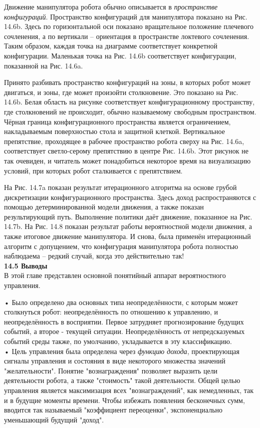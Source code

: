 \documentclass[10pt,a4paper]{article}
\begin{document}
Движение манипулятора робота обычно описывается в \textit{пространстве конфигураций}. Пространство конфигураций для манипулятора показано на Рис. 14.6b. Здесь по горизонтальной оси показано вращательное положение плечевого сочленения, а по вертикали – ориентация в пространстве локтевого сочленения. Таким образом, каждая точка на диаграмме соответствует конкретной конфигурации. Маленькая точка на Рис. 14.6b соответствует конфигурации, показанной на Рис. 14.6a.

Принято разбивать пространство конфигураций на зоны, в которых робот может двигаться, и зоны, где может произойти столкновение. Это показано на Рис. 14.6b. Белая область на рисунке соответствует конфигурационному пространству, где столкновений не происходит, обычно называемому свободным пространством. Чёрная граница конфигурационного пространства является ограничением, накладываемым поверхностью стола и защитной клеткой. Вертикальное препятствие, проходящее в рабочее пространство робота сверху на Рис. 14.6a, соответствует светло-серому препятствию в центре Рис. 14.6b. Этот рисунок не так очевиден, и читатель может понадобиться некоторое время на визуализацию условий, при которых робот сталкивается с препятствием.

На Рис. 14.7a показан результат итерационного алгоритма на основе грубой дискретизации конфигурационного пространства. Здесь доход распространяются с помощью детерминированной модели движения, а также показан результирующий путь. Выполнение политики даёт движение, показанное на Рис. 14.7b. На Рис. 14.8 показан результат работы вероятностной модели движения, а также итоговое движение манипулятора. И снова, была применён итерационный алгоритм с допущением, что конфигурация манипулятора робота полностью наблюдаема – редкий случай, когда это действительно так!\\

\textbf{14.5	Выводы}\\

В этой главе представлен основной понятийный аппарат вероятностного управления.

•	Было определено два основных типа неопределённости, с которым может столкнуться робот: неопределённость по отношению к управлению, и неопределённость в восприятии. Первое затрудняет прогнозирование будущих событий, а второе - текущей ситуации. Неопределённость от непредсказуемых событий среды также, по умолчанию, укладывается в эту классификацию.\\

•	Цель управления была определена через \textit{функцию дохода}, проектирующая сигналы управления и состояния в виде  некоторого множества значений "желательности". Понятие "вознаграждения" позволяет выразить цели деятельности робота, а также "стоимость" такой деятельности. Общей целью управления является максимизация всех "вознаграждений", как немедленных, так и в будущие моменты времени. Чтобы избежать появления бесконечных сумм, вводится так называемый "коэффициент переоценки", экспоненциально уменьшающий будущий "доход".\\
\end{document}
